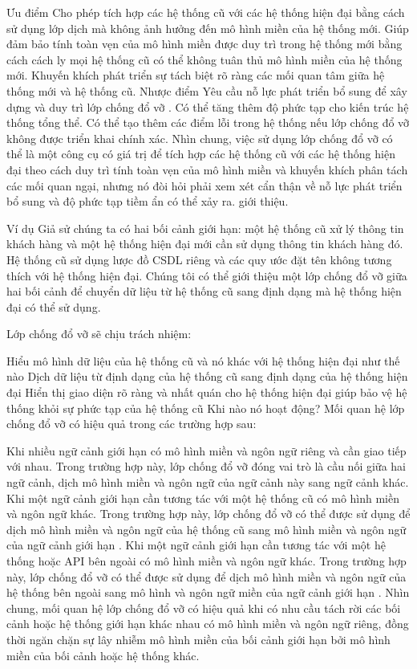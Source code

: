 Ưu điểm
Cho phép tích hợp các hệ thống cũ với các hệ thống hiện đại bằng cách sử dụng lớp dịch mà không ảnh hưởng đến mô hình miền của hệ thống mới.
Giúp đảm bảo tính toàn vẹn của mô hình miền được duy trì trong hệ thống mới bằng cách cách ly mọi hệ thống cũ có thể không tuân thủ mô hình miền của hệ thống mới.
Khuyến khích phát triển sự tách biệt rõ ràng các mối quan tâm giữa hệ thống mới và hệ thống cũ.
Nhược điểm
Yêu cầu nỗ lực phát triển bổ sung để xây dựng và duy trì lớp chống đổ vỡ .
Có thể tăng thêm độ phức tạp cho kiến trúc hệ thống tổng thể.
Có thể tạo thêm các điểm lỗi trong hệ thống nếu lớp chống đổ vỡ không được triển khai chính xác.
Nhìn chung, việc sử dụng lớp chống đổ vỡ có thể là một công cụ có giá trị để tích hợp các hệ thống cũ với các hệ thống hiện đại theo cách duy trì tính toàn vẹn của mô hình miền và khuyến khích phân tách các mối quan ngại, nhưng nó đòi hỏi phải xem xét cẩn thận về nỗ lực phát triển bổ sung và độ phức tạp tiềm ẩn có thể xảy ra. giới thiệu.

Ví dụ
Giả sử chúng ta có hai bối cảnh giới hạn: một hệ thống cũ xử lý thông tin khách hàng và một hệ thống hiện đại mới cần sử dụng thông tin khách hàng đó. Hệ thống cũ sử dụng lược đồ CSDL riêng và các quy ước đặt tên không tương thích với hệ thống hiện đại. Chúng tôi có thể giới thiệu một lớp chống đổ vỡ giữa hai bối cảnh để chuyển dữ liệu từ hệ thống cũ sang định dạng mà hệ thống hiện đại có thể sử dụng.

Lớp chống đổ vỡ sẽ chịu trách nhiệm:

Hiểu mô hình dữ liệu của hệ thống cũ và nó khác với hệ thống hiện đại như thế nào
Dịch dữ liệu từ định dạng của hệ thống cũ sang định dạng của hệ thống hiện đại
Hiển thị giao diện rõ ràng và nhất quán cho hệ thống hiện đại giúp bảo vệ hệ thống khỏi sự phức tạp của hệ thống cũ
Khi nào nó hoạt động?
Mối quan hệ lớp chống đổ vỡ có hiệu quả trong các trường hợp sau:

Khi nhiều ngữ cảnh giới hạn có mô hình miền và ngôn ngữ riêng và cần giao tiếp với nhau. Trong trường hợp này, lớp chống đổ vỡ đóng vai trò là cầu nối giữa hai ngữ cảnh, dịch mô hình miền và ngôn ngữ của ngữ cảnh này sang ngữ cảnh khác.
Khi một ngữ cảnh giới hạn cần tương tác với một hệ thống cũ có mô hình miền và ngôn ngữ khác. Trong trường hợp này, lớp chống đổ vỡ có thể được sử dụng để dịch mô hình miền và ngôn ngữ của hệ thống cũ sang mô hình miền và ngôn ngữ của ngữ cảnh giới hạn .
Khi một ngữ cảnh giới hạn cần tương tác với một hệ thống hoặc API bên ngoài có mô hình miền và ngôn ngữ khác. Trong trường hợp này, lớp chống đổ vỡ có thể được sử dụng để dịch mô hình miền và ngôn ngữ của hệ thống bên ngoài sang mô hình và ngôn ngữ miền của ngữ cảnh giới hạn .
Nhìn chung, mối quan hệ lớp chống đổ vỡ có hiệu quả khi có nhu cầu tách rời các bối cảnh hoặc hệ thống giới hạn khác nhau có mô hình miền và ngôn ngữ riêng, đồng thời ngăn chặn sự lây nhiễm mô hình miền của bối cảnh giới hạn bởi mô hình miền của bối cảnh hoặc hệ thống khác.

